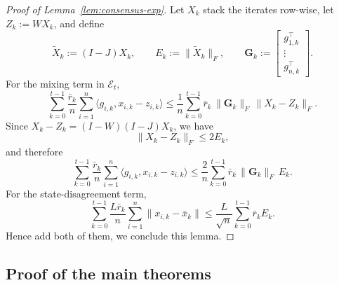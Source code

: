 \documentclass[runningheads]{llncs}
\begin{document}
\begin{proof}[Proof of Lemma~\ref{lem:consensus-exp}]
Let \(X_k\) stack the iterates row-wise, let \(Z_k:=WX_k\), and define
\[
\widetilde X_k:=(I-J)X_k,
\qquad
E_k:=\|\widetilde X_k\|_F,
\qquad
\mathbf G_k:=\begin{bmatrix} g_{1,k}^\top \\ \vdots \\ g_{n,k}^\top \end{bmatrix}.
\]
For the mixing term in \(\mathcal E_t\),
\[
\sum_{k=0}^{t-1}\frac{\bar r_k}{n}\sum_{i=1}^n
\langle g_{i,k},x_{i,k}-z_{i,k}\rangle
\le
\frac{1}{n}\sum_{k=0}^{t-1}\bar r_k\,\|\mathbf G_k\|_F\,\|X_k-Z_k\|_F.
\]
Since \(X_k-Z_k=(I-W)(I-J)X_k\), we have
\[
\|X_k-Z_k\|_F\le 2E_k,
\]
and therefore
\[
\sum_{k=0}^{t-1}\frac{\bar r_k}{n}\sum_{i=1}^n
\langle g_{i,k},x_{i,k}-z_{i,k}\rangle
\le
\frac{2}{n}\sum_{k=0}^{t-1}\bar r_k\,\|\mathbf G_k\|_F\,E_k.
\]
For the state-disagreement term,
\[
\sum_{k=0}^{t-1}\frac{L\bar r_k}{n}\sum_{i=1}^n \|x_{i,k}-\bar x_k\|
\le
\frac{L}{\sqrt n}\sum_{k=0}^{t-1}\bar r_k E_k.
\]
Hence add both of them, we conclude this lemma.
\end{proof}

\subsection{Proof of the main theorems}
\end{document}
